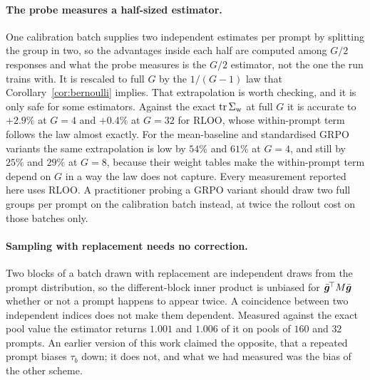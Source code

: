 \paragraph{The probe measures a half-sized estimator.} One calibration batch supplies two
independent estimates per prompt by splitting the group in two, so the advantages inside each half
are computed among $G/2$ responses and what the probe measures is the $G/2$ estimator, not the one
the run trains with. It is rescaled to full $G$ by the $1/(G-1)$ law that
Corollary~\ref{cor:bernoulli} implies. That extrapolation is worth checking, and it is only safe
for some estimators. Against the exact $\operatorname{tr}\Sigma_{\mathrm{w}}$ at full $G$ it is accurate to $+2.9\%$ at $G=4$ and
$+0.4\%$ at $G=32$ for RLOO, whose within-prompt term follows the law almost exactly. For the
mean-baseline and standardised GRPO variants the same extrapolation is low by $54\%$ and $61\%$ at
$G=4$, and still by $25\%$ and $29\%$ at $G=8$, because their weight tables make the within-prompt
term depend on $G$ in a way the law does not capture. Every measurement reported here uses RLOO.
A practitioner probing a GRPO variant should draw two full groups per prompt on the calibration
batch instead, at twice the rollout cost on those batches only.

\paragraph{Sampling with replacement needs no correction.} Two blocks of a batch drawn with
replacement are independent draws from the prompt distribution, so the different-block inner
product is unbiased for $\bar{\bm{g}}^{\!\top} M \bar{\bm{g}}$ whether or not a prompt happens to appear twice.
A coincidence between two independent indices does not make them dependent. Measured against the
exact pool value the estimator returns $1.001$ and $1.006$ of it on pools of $160$ and $32$
prompts. An earlier version of this work claimed the opposite, that a repeated prompt biases
$\tau_b$ down; it does not, and what we had measured was the bias of the other scheme.

